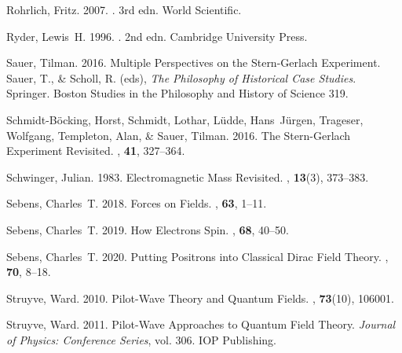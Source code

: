 \documentclass[onecolumn,secnumarabic,amsmath,amssymb,balancelastpage,nofootinbib]{article}
\begin{document}
\begin{thebibliography}{}
Rohrlich, Fritz. 2007.
. 3rd edn.
\newblock World Scientific.

Ryder, Lewis~H. 1996.
. 2nd edn.
\newblock Cambridge University Press.

Sauer, Tilman. 2016.
\newblock Multiple Perspectives on the Stern-Gerlach Experiment.
 Sauer, T., \& Scholl, R. (eds), {\em The Philosophy of
  Historical Case Studies}.
\newblock Springer.
\newblock Boston Studies in the Philosophy and History of Science 319.

Schmidt-B\"{o}cking, Horst, Schmidt, Lothar, L\"{u}dde, Hans~J\"{u}rgen,
  Trageser, Wolfgang, Templeton, Alan, \& Sauer, Tilman. 2016.
\newblock The Stern-Gerlach Experiment Revisited.
, {\bf 41}, 327--364.

Schwinger, Julian. 1983.
\newblock Electromagnetic Mass Revisited.
, {\bf 13}(3), 373--383.

Sebens, Charles~T. 2018.
\newblock Forces on Fields.
, {\bf 63},
  1--11.

Sebens, Charles~T. 2019.
\newblock How Electrons Spin.
, {\bf 68},
  40--50.

Sebens, Charles~T. 2020.
\newblock Putting Positrons into Classical Dirac Field Theory.
, {\bf 70},
  8--18.

Struyve, Ward. 2010.
\newblock Pilot-Wave Theory and Quantum Fields.
, {\bf 73}(10), 106001.

Struyve, Ward. 2011.
\newblock Pilot-Wave Approaches to Quantum Field Theory.
 {\em Journal of Physics: Conference Series},
  vol. 306.
\newblock IOP Publishing.


\end{thebibliography}
\end{document}
